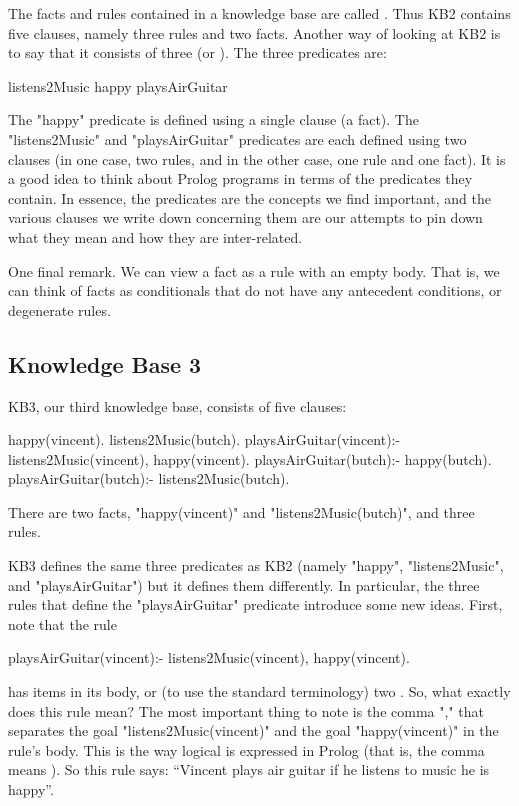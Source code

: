 The facts and rules contained in a knowledge base are called
.  Thus KB2 contains five clauses, namely three rules
and two facts. Another way of looking at KB2 is to say that it
consists of three  (or ). The
three predicates are:
\begin{LPNcodedisplay}
listens2Music
happy
playsAirGuitar
\end{LPNcodedisplay}
The "happy" predicate is defined using a single clause (a fact). The
"listens2Music" and "playsAirGuitar" predicates are each defined using
two clauses (in one case, two rules, and in the other case, one rule
and one fact).  It is a good idea to think about Prolog programs in
terms of the predicates they contain.  In essence, the predicates are
the concepts we find important, and the various clauses we write down
concerning them are our attempts to pin down what they mean and how
they are inter-related.

One final remark. We can view a fact as a rule with an empty body.
That is, we can think of facts as conditionals that do not have any
antecedent conditions, or degenerate rules.



\subsection*{Knowledge Base 3}\label{SUBSEC.L1.KB3}



KB3, our third knowledge base, consists of five clauses:

\begin{LPNcodedisplay}
happy(vincent).
listens2Music(butch).
playsAirGuitar(vincent):-
   listens2Music(vincent),
   happy(vincent).
playsAirGuitar(butch):-
   happy(butch).
playsAirGuitar(butch):-
   listens2Music(butch).
\end{LPNcodedisplay}
There are two facts,  "happy(vincent)" and
"listens2Music(butch)", and three rules.


KB3 defines the same three predicates as KB2 (namely "happy",
"listens2Music", and "playsAirGuitar") but it defines them
differently.  In particular, the three rules that define the
"playsAirGuitar" predicate introduce some new ideas. First, note that
the rule
\begin{LPNcodedisplay}
playsAirGuitar(vincent):-
   listens2Music(vincent),
   happy(vincent).
\end{LPNcodedisplay}
has  items in its body, or (to use the standard
terminology) two .  So, what exactly does this rule
mean?  The most important thing to note is the comma "," that
separates the goal "listens2Music(vincent)" and the goal
"happy(vincent)" in the rule's body.  This is the way logical
 is expressed in Prolog (that is, the comma means
).  So this rule says: ``Vincent plays air guitar if he
listens to music  he is happy''.

